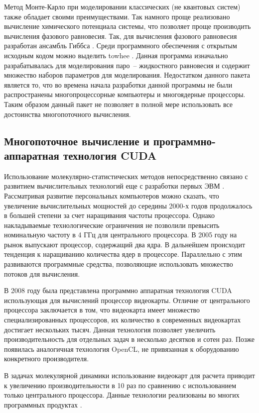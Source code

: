 Метод Монте-Карло при моделировании классических (не квантовых систем) также обладает своими преимуществами. Так намного проще реализовано вычисление химического потенциала системы, что позволяет проще производить вычисления фазового равновесия. Так, для вычисления фазового равновесия разработан ансамбль Гиббса \cite{Panagiotopoulos1987,Orkoulas1994}. Среди программного обеспечения с открытым исходным кодом можно выделить towhee \cite{Martin2013}. Данная программа изначально разрабатывалась для моделирования паро~-- жидкостного равновесия и содержит множество наборов параметров для моделирования. Недостатком данного пакета является то, что во времена начала разработки данной программы не были распространены многопроцессорные компьютеры и многоядерные процессоры. Таким образом данный пакет не позволяет в полной мере использовать все достоинства многопоточного вычисления.



\subsection{Многопоточное вычисление и программно-аппаратная технология CUDA}
Использование молекулярно-статистических методов непосредственно связано с развитием вычислительных технологий еще с разработки первых ЭВМ \cite{Allen1988}. Рассматривая развитие персональных компьютеров можно сказать, что увеличение вычислительных мощностей до середины 2000-х годов продолжалось в большей степени за счет наращивания частоты процессора. Однако накладываемые технологические ограничения не позволили превысить номинальную частоту в 4 ГГц для центрального процессора. В 2005 году на рынок выпускают процессор, содержащий два ядра. В дальнейшем происходит тенденция к наращиванию количества ядер в процессоре. Параллельно с этим развиваются программные средства, позволяющие использовать множество потоков для вычисления.

В 2008 году была представлена программно аппаратная технология CUDA использующая для вычислений процессор видеокарты. Отличие от центрального процессора заключается в том, что видеокарта имеет множество специализированных процессоров, их количество в современных видеокартах достигает нескольких тысяч. Данная технология позволяет увеличить производительность для отдельных задач в несколько десятков и сотен раз. Позже появилась аналогичная технология OpenCL, не привязанная к оборудованию конкретного производителя.

В задачах молекулярной динамики использование видеокарт для расчета приводит к увеличению производительности в 10 раз по сравнению с использованием только центрального процессора. Данные технологии реализованы во многих программных продуктах \cite{wiki_progs}.

